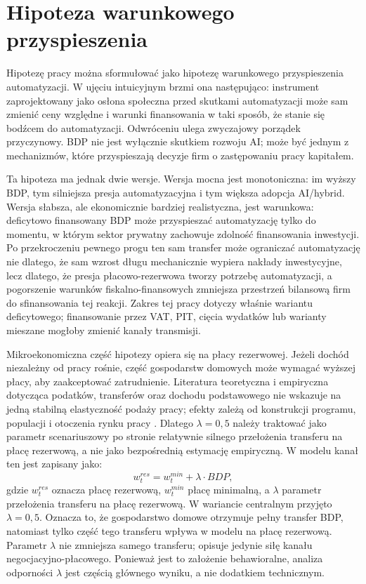 \section{Hipoteza warunkowego przyspieszenia}

Hipotezę pracy można sformułować jako hipotezę warunkowego przyspieszenia automatyzacji. W ujęciu intuicyjnym brzmi ona następująco: instrument zaprojektowany jako osłona społeczna przed skutkami automatyzacji może sam zmienić ceny względne i warunki finansowania w taki sposób, że stanie się bodźcem do automatyzacji. Odwróceniu ulega zwyczajowy porządek przyczynowy. BDP nie jest wyłącznie skutkiem rozwoju AI; może być jednym z mechanizmów, które przyspieszają decyzje firm o zastępowaniu pracy kapitałem.

Ta hipoteza ma jednak dwie wersje. Wersja mocna jest monotoniczna: im wyższy BDP, tym silniejsza presja automatyzacyjna i tym większa adopcja AI/hybrid. Wersja słabsza, ale ekonomicznie bardziej realistyczna, jest warunkowa: deficytowo finansowany BDP może przyspieszać automatyzację tylko do momentu, w którym sektor prywatny zachowuje zdolność finansowania inwestycji. Po przekroczeniu pewnego progu ten sam transfer może ograniczać automatyzację nie dlatego, że sam wzrost długu mechanicznie wypiera nakłady inwestycyjne, lecz dlatego, że presja płacowo-rezerwowa tworzy potrzebę automatyzacji, a pogorszenie warunków fiskalno-finansowych zmniejsza przestrzeń bilansową firm do sfinansowania tej reakcji. Zakres tej pracy dotyczy właśnie wariantu deficytowego; finansowanie przez VAT, PIT, cięcia wydatków lub warianty mieszane mogłoby zmienić kanały transmisji.

Mikroekonomiczna część hipotezy opiera się na płacy rezerwowej. Jeżeli dochód niezależny od pracy rośnie, część gospodarstw domowych może wymagać wyższej płacy, aby zaakceptować zatrudnienie. Literatura teoretyczna i empiryczna dotycząca podatków, transferów oraz dochodu podstawowego nie wskazuje na jedną stabilną elastyczność podaży pracy; efekty zależą od konstrukcji programu, populacji i otoczenia rynku pracy \parencite{mirrlees1971,saez2002,vanParijs2017,forget2011,marinescu2018,kangas2019,jonesMarinescu2022,hoynesRothstein2019,banerjee2019}. Dlatego \(\lambda = 0{,}5\) należy traktować jako parametr scenariuszowy po stronie relatywnie silnego przełożenia transferu na płacę rezerwową, a nie jako bezpośrednią estymację empiryczną. W modelu \amor{} kanał ten jest zapisany jako:
\begin{equation}
  w^{res}_t = w^{min}_t + \lambda \cdot BDP,
\end{equation}
gdzie \(w^{res}_t\) oznacza płacę rezerwową, \(w^{min}_t\) płacę minimalną, a \(\lambda\) parametr przełożenia transferu na płacę rezerwową. W wariancie centralnym przyjęto \(\lambda = 0{,}5\). Oznacza to, że gospodarstwo domowe otrzymuje pełny transfer BDP, natomiast tylko część tego transferu wpływa w modelu na płacę rezerwową. Parametr \(\lambda\) nie zmniejsza samego transferu; opisuje jedynie siłę kanału negocjacyjno-płacowego. Ponieważ jest to założenie behawioralne, analiza odporności \(\lambda\) jest częścią głównego wyniku, a nie dodatkiem technicznym.

